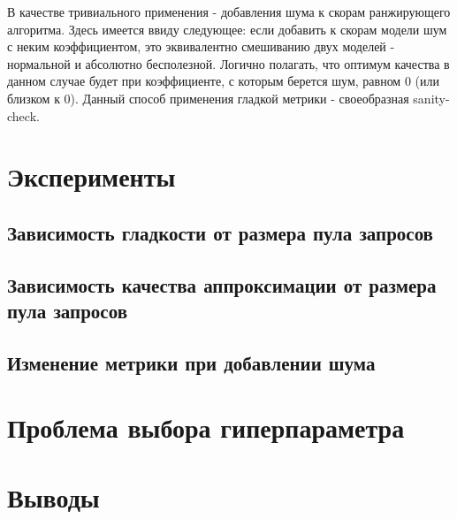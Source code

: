 \documentclass[12pt,a4paper]{amsart}
\theoremstyle{definition}
\theoremstyle{definition}
\begin{document}
В качестве тривиального применения - добавления шума к скорам ранжирующего алгоритма. Здесь имеется ввиду следующее: если добавить к скорам модели шум с неким коэффициентом, это эквивалентно смешиванию двух моделей - нормальной и абсолютно бесполезной. Логично полагать, что оптимум качества в данном случае будет при коэффициенте, с которым берется шум, равном 0 (или близком к 0). Данный способ применения гладкой метрики - своеобразная sanity-check.


\newpage
\section{Эксперименты}

\subsection{Зависимость гладкости от размера пула запросов}
\pagebreak


\subsection{Зависимость качества аппроксимации от размера пула запросов}
\pagebreak


\subsection{Изменение метрики при добавлении шума}
\pagebreak


\newpage
\section{Проблема выбора гиперпараметра}


\newpage
\section{Выводы}
\end{document}
